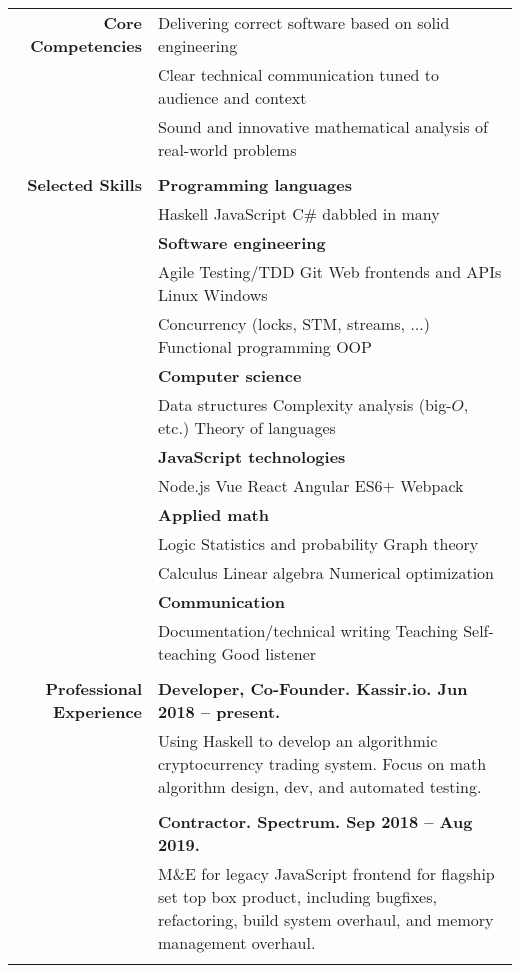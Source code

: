 \documentclass{article}
\newcommand\spc{\hspace{8pt}}
\begin{document}
\bgroup
\begin{tabular}{rl}
  \def\arraystrech{1.5}
  {\bf Core Competencies} & Delivering correct software based on solid engineering \\
   & Clear technical communication tuned to audience and context \\
  & Sound and innovative mathematical analysis of real-world problems \\ \\

  {\bf Selected Skills}  & {\bf Programming languages} \\
  & Haskell \spc JavaScript \spc C\# \spc dabbled in many \\
  & {\bf Software engineering} \\
  & Agile \spc Testing/TDD \spc Git \spc Web frontends and APIs \spc Linux \spc Windows \\
  & Concurrency (locks, STM, streams, ...) \spc Functional programming \spc OOP \\
  & {\bf Computer science} \\
  & Data structures \spc Complexity analysis (big-$O$, etc.) \spc Theory of languages \\
  & {\bf JavaScript technologies} \\
  & Node.js \spc Vue \spc React \spc Angular \spc ES6+ \spc Webpack \\
  & {\bf Applied math} \\
  & Logic \spc Statistics and probability \spc Graph theory \\
  & Calculus \spc Linear algebra \spc Numerical optimization \\
  & {\bf Communication} \\
  & Documentation/technical writing \spc Teaching \spc Self-teaching \spc Good listener \\ \\

  {\bf Professional Experience}
  & {\bf Developer, Co-Founder. Kassir.io. Jun 2018 -- present.} \\
  & \parbox{4.5in}{Using Haskell to develop an algorithmic cryptocurrency trading system. Focus on math algorithm design, dev, and automated testing.} \\ \\

  & {\bf Contractor. Spectrum. Sep 2018 -- Aug 2019.} \\
  & \parbox{4.5in}{M\&E for legacy JavaScript frontend for flagship set top box product, including bugfixes, refactoring, build system overhaul, and memory management overhaul.} \\ \\


\end{tabular}
\end{document}
